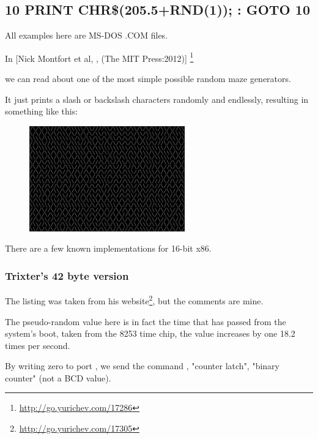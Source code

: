\subsection{10 PRINT CHR\$(205.5+RND(1)); : GOTO 10}

All examples here are MS-DOS .COM files.

In [Nick Montfort et al, , (The MIT Press:2012)]
\footnote{\AlsoAvailableAs \url{http://go.yurichev.com/17286}}

we can read about one of the most simple possible random maze generators.

It just prints a slash or backslash characters randomly and endlessly, resulting in something like this:

\begin{figure}[H]
\centering
\includegraphics[width=0.6\textwidth]{examples/demos/10print/10print.png}
\end{figure}

There are a few known implementations for 16-bit x86.

\subsubsection{Trixter's 42 byte version}

\newcommand{\FNURLTRIXTER}{\footnote{\url{http://go.yurichev.com/17305}}}

The listing was taken from his website\FNURLTRIXTER, 
but the comments are mine.



The pseudo-random value here is in fact the time 
that has passed from the system's boot, taken from the 8253 time chip, the value increases by one 18.2 times per second.

By writing zero to port , 
we send the command , 
"counter latch", 
"binary counter" (not a \ac{BCD} value).

